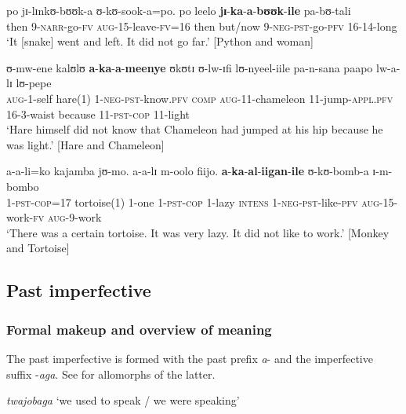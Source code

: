 \begin{exe}
\ex \label{exNegativePastPerfective1}
\gll po jɪ-lɪnkʊ-bʊʊk-a ʊ-kʊ-sook-a=po. po leelo \textbf{jɪ}-\textbf{ka}-\textbf{a}-\textbf{bʊʊk}-\textbf{ile} pa-bʊ-tali\\
then 9-\textsc{narr}-go-\textsc{fv} \textsc{aug}-15-leave-\textsc{fv}=16 then but/now 9-\textsc{neg}-\textsc{pst}-go-\textsc{pfv} 16-14-long\\
\glt \lq It [snake] went and left. It did not go far.' [Python and woman]

\ex \label{exNegativePastPerfective2}
\gll ʊ-mw-ene kalʊlʊ \textbf{a}-\textbf{ka}-\textbf{a}-\textbf{meenye} ʊkʊtɪ ʊ-lw-ɪfi lʊ-nyeel-iile pa-n-sana paapo lw-a-lɪ lʊ-pepe\\
\textsc{aug}-1-self hare(1) 1-\textsc{neg}-\textsc{pst}-know.\textsc{pfv} \textsc{comp} \textsc{aug}-11-chameleon 11-jump-\textsc{appl.pfv} 16-3-waist because 11-\textsc{pst}-\textsc{cop} 11-light\\
\glt \lq Hare himself did not know that Chameleon had jumped at his hip because he was light.' [Hare and Chameleon]

\ex \label{exNegativePastPerfective3} \gll a-a-li=ko kajamba jʊ-mo. a-a-lɪ m-oolo fiijo. \textbf{a}-\textbf{ka}-\textbf{al}-\textbf{iigan}-\textbf{ile} ʊ-kʊ-bomb-a ɪ-m-bombo\\
1-\textsc{pst}-\textsc{cop}=17 tortoise(1) 1-one 1-\textsc{pst}-\textsc{cop} 1-lazy \textsc{intens} 1-\textsc{neg}-\textsc{pst}-like-\textsc{pfv} \textsc{aug}-15-work-\textsc{fv} \textsc{aug}-9-work\\
\glt \lq There was a certain tortoise. It was very lazy. It did not like to work.' [Monkey and Tortoise]
\end{exe}
\subsection{Past imperfective}\label{PastImperfective}
\subsubsection{Formal makeup and overview of meaning}
The past imperfective is formed with the past prefix \textit{a}- and the imperfective suffix -\textit{aga}. See  for allomorphs of the latter.

\begin{exe}
\ex \textit{twajobaga} \lq we used to speak / we were speaking'
\end{exe}


